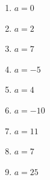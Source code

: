 %
%
  \begin{enumerate}[cols=3]
    \item \(a=0\)
    \item \(a=2\)
    \item \(a=7\)
    \item \(a=-5\)
    \item \(a=4\)
    \item \(a=-10\)
    \item \(a=11\)
    \item \(a=7\)
    \item \(a=25\)
  \end{enumerate}
